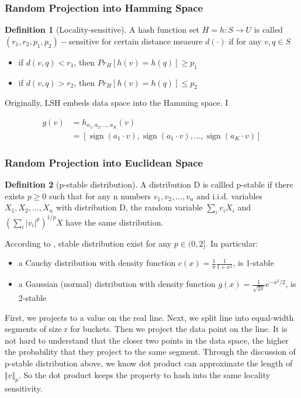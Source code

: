 \documentclass[letterpaper,twocolumn,10pt]{article}
\DeclareMathOperator{\sign}{sign}
\theoremstyle{definition}
\newtheorem{definition}{Definition}[section]
\begin{document}
\subsubsection{Random Projection into Hamming  Space}
\begin{definition}[Locality-sensitive]
	A hash function set $H = {h : S \rightarrow U}$ is called $(r_1, r_2, p_1, p_2)-$sensitive for certain distance measure $d(\cdot)$ if for any $v, q \in S$
	\begin{itemize}
		\item if $d(v, q)<r_1$, then $Pr_H[h(v)=h(q)]\geq p_1$
		\item if $d(v, q)>r_2$, then $Pr_H[h(v)=h(q)]\leq p_2$		
	\end{itemize}
\end{definition}
Originally, LSH embeds data space into the Hamming space. I

\begin{align*}
g(v) &= h_{a_1, a_2, ..., a_K}(v)  \\
&= [\sign{(a_1\cdot v )}, \sign{(a_1\cdot v )}, ..., \sign{(a_K\cdot v )}]
\end{align*}

\subsubsection{Random Projection into  Euclidean Space}

\begin{definition}[p-stable distribution]
	A distribution D is callled p-stable if there exists $p \geq 0$ such that for any n numbers $v_1, v_2,...,v_n$ and i.i.d. variables $X_1, X_2,...,X_n$ with distribution D, the random variable $\sum_i{v_i X_i} $ and $ (\sum_i |v_i|^p)^{1/p}X$ have the same distribution.


\end{definition}
According to \cite{zolotarev1986one}, stable distribution exist for any $p \in (0, 2]$. In particular:
\begin{itemize}	
	\item a Cauchy distribution with density function $c(x) = \frac{1}{\pi}\frac{1}{1+x^2}$, is 1-stable
	\item a Gaussian (normal) distribution with density function $g(x) = \frac{1}{\sqrt{2\pi}}e^{-x^2/2}$, is 2-stable
\end{itemize}

First, we projects to a value on the real line. Next, we split line into equal-width segments of size r for buckets. Then we project the data point on the line. It is not hard to understand that the closer two points in the data space, the higher the probability that they project to the same segment. Through the discussion of p-stable distribution above, we know dot product can approximate the length of $\Vert v\Vert_p$. So the dot product keeps the property to hash into the same locality sensitivity.
\end{document}
